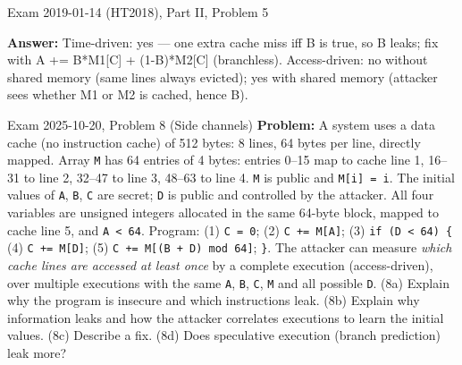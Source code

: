 \documentclass[12pt, a4paper]{article}
\begin{document}
\begin{practicebox}{Exam 2019-01-14 (HT2018), Part II, Problem 5}
\begin{itemize}
\end{itemize}
\textbf{Answer:} Time-driven: yes --- one extra cache miss iff B is true, so B leaks; fix with A += B*M1[C] + (1-B)*M2[C] (branchless). Access-driven: no without shared memory (same lines always evicted); yes with shared memory (attacker sees whether M1 or M2 is cached, hence B).
\end{practicebox}

\begin{practicebox}{Exam 2025-10-20, Problem 8 (Side channels)}
\textbf{Problem:} A system uses a data cache (no instruction cache) of 512 bytes: 8 lines, 64 bytes per line, directly mapped. Array \texttt{M} has 64 entries of 4 bytes: entries 0--15 map to cache line 1, 16--31 to line 2, 32--47 to line 3, 48--63 to line 4. \texttt{M} is public and \texttt{M[i] = i}. The initial values of \texttt{A}, \texttt{B}, \texttt{C} are secret; \texttt{D} is public and controlled by the attacker. All four variables are unsigned integers allocated in the same 64-byte block, mapped to cache line 5, and \texttt{A < 64}. Program: (1) \texttt{C = 0}; (2) \texttt{C += M[A]}; (3) \texttt{if (D < 64) \{} (4) \texttt{C += M[D]}; (5) \texttt{C += M[(B + D) mod 64]}; \texttt{\}}. The attacker can measure \emph{which cache lines are accessed at least once} by a complete execution (access-driven), over multiple executions with the same \texttt{A}, \texttt{B}, \texttt{C}, \texttt{M} and all possible \texttt{D}. (8a) Explain why the program is insecure and which instructions leak. (8b) Explain why information leaks and how the attacker correlates executions to learn the initial values. (8c) Describe a fix. (8d) Does speculative execution (branch prediction) leak more?


\end{practicebox}
\end{document}
